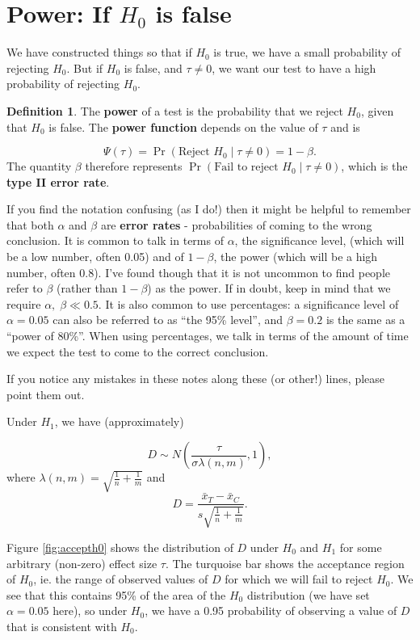 \documentclass[
  openany]{book}
\theoremstyle{definition}
\newtheorem{definition}{Definition}[chapter]
\theoremstyle{definition}
\theoremstyle{definition}
\theoremstyle{definition}
\theoremstyle{remark}
\begin{document}
\hypertarget{sec-power}{%
\section{\texorpdfstring{Power: If \(H_0\) is false}{Power: If H\_0 is false}}\label{sec-power}}

We have constructed things so that if \(H_0\) is true, we have a small probability of rejecting \(H_0\). But if \(H_0\) is false, and \(\tau\neq{0}\), we want our test to have a high probability of rejecting \(H_0\).

\begin{definition}
The \textbf{power} of a test is the probability that we reject \(H_0\), given that \(H_0\) is false. The \textbf{power function} depends on the value of \(\tau\) and is

\[\Psi\left(\tau\right) = \Pr\left(\text{Reject } H_0\mid{\tau\neq{0}}\right) = 1 - \beta.\]
The quantity \(\beta\) therefore represents \(\Pr\left(\text{Fail to reject } H_0\mid{\tau\neq{0}}\right)\), which is the \textbf{type II error rate}.
\end{definition}

If you find the notation confusing (as I do!) then it might be helpful to remember that both \(\alpha\) and \(\beta\) are \textbf{error rates} - probabilities of coming to the wrong conclusion. It is common to talk in terms of \(\alpha\), the significance level, (which will be a low number, often 0.05) and of \(1-\beta\), the power (which will be a high number, often 0.8). I've found though that it is not uncommon to find people refer to \(\beta\) (rather than \(1-\beta\)) as the power. If in doubt, keep in mind that we require \(\alpha,\;\beta \ll 0.5\). It is also common to use percentages: a significance level of \(\alpha=0.05\) can also be referred to as ``the 95\% level'', and \(\beta=0.2\) is the same as a ``power of 80\%''. When using percentages, we talk in terms of the amount of time we expect the test to come to the correct conclusion.

If you notice any mistakes in these notes along these (or other!) lines, please point them out.

Under \(H_1\), we have (approximately)

\[D \sim{N\left(\frac{\tau}{\sigma\lambda\left(n,m\right)}, 1\right)},\]
where \(\lambda\left(n,m\right) = \sqrt{\frac{1}{n}+\frac{1}{m}}\) and
\[D = \frac{\bar{x}_T - \bar{x}_C}{s\sqrt{\frac{1}{n} + \frac{1}{m}}}.\]

Figure \ref{fig:accepth0} shows the distribution of \(D\) under \(H_0\) and \(H_1\) for some arbitrary (non-zero) effect size \(\tau\). The turquoise bar shows the acceptance region of \(H_0\), ie. the range of observed values of \(D\) for which we will fail to reject \(H_0\). We see that this contains 95\% of the area of the \(H_0\) distribution (we have set \(\alpha = 0.05\) here), so under \(H_0\), we have a 0.95 probability of observing a value of \(D\) that is consistent with \(H_0\).
\end{document}
